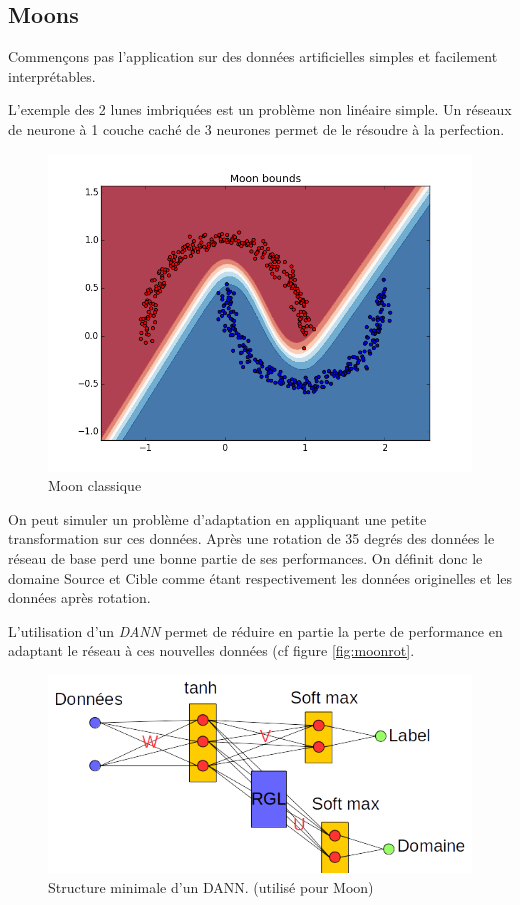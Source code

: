 \subsection{Moons} %
\label{sub:moons}
Commençons pas l'application sur des données artificielles simples et 
facilement interprétables.

L'exemple des 2 lunes imbriquées est un problème non linéaire simple. Un
réseaux de neurone à 1 couche caché de 3 neurones permet de le résoudre
à la perfection.

\begin{figure}[htbp]
\centering
\includegraphics[width=\columnwidth]{fig/moon-bound-0.png}
\caption{Moon classique}
\end{figure}

On peut simuler un problème d'adaptation en appliquant une petite
transformation sur ces données.
Après une rotation de 35 degrés des données le réseau de base perd une bonne
partie de ses performances. On définit donc le domaine Source et Cible
comme étant respectivement les données originelles et les données après
rotation.

L'utilisation d'un \emph{DANN} permet de réduire en partie la perte de 
performance en adaptant le réseau à ces nouvelles données (cf figure \ref{fig:moonrot}.

\begin{figure}[htbp]
\centering
\includegraphics[width=\columnwidth]{fig/DANN-simple.png}
\caption{Structure minimale d'un DANN. (utilisé pour Moon)}
\end{figure}

